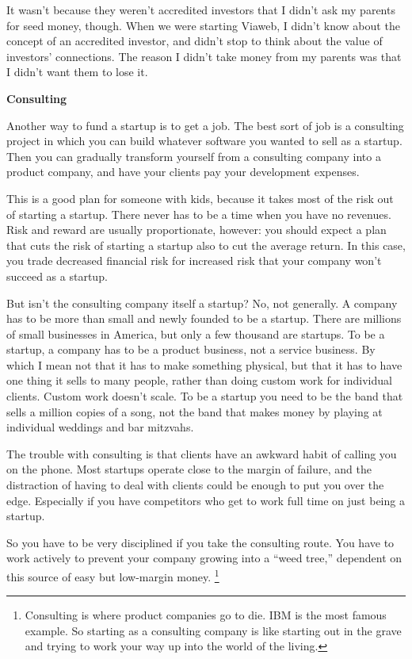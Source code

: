 \documentclass[12pt]{book}
\begin{document}
It wasn't because they weren't accredited investors that I didn't ask my
parents for seed money, though. When we were starting Viaweb, I didn't
know about the concept of an accredited investor, and didn't stop to
think about the value of investors' connections. The reason I didn't
take money from my parents was that I didn't want them to lose it.

\textbf{Consulting}

Another way to fund a startup is to get a job. The best sort of job is a
consulting project in which you can build whatever software you wanted
to sell as a startup. Then you can gradually transform yourself from a
consulting company into a product company, and have your clients pay
your development expenses.

This is a good plan for someone with kids, because it takes most of the
risk out of starting a startup. There never has to be a time when you
have no revenues. Risk and reward are usually proportionate, however:
you should expect a plan that cuts the risk of starting a startup also
to cut the average return. In this case, you trade decreased financial
risk for increased risk that your company won't succeed as a startup.

But isn't the consulting company itself a startup? No, not generally. A
company has to be more than small and newly founded to be a startup.
There are millions of small businesses in America, but only a few
thousand are startups. To be a startup, a company has to be a product
business, not a service business. By which I mean not that it has to
make something physical, but that it has to have one thing it sells to
many people, rather than doing custom work for individual clients.
Custom work doesn't scale. To be a startup you need to be the band that
sells a million copies of a song, not the band that makes money by
playing at individual weddings and bar mitzvahs.

The trouble with consulting is that clients have an awkward habit of
calling you on the phone. Most startups operate close to the margin of
failure, and the distraction of having to deal with clients could be
enough to put you over the edge. Especially if you have competitors who
get to work full time on just being a startup.

So you have to be very disciplined if you take the consulting route. You
have to work actively to prevent your company growing into a ``weed
tree,'' dependent on this source of easy but low-margin money.
\footnote{Consulting is where product companies go to die. IBM is the most
famous example. So starting as a consulting company is like starting out
in the grave and trying to work your way up into the world of the
living.}
\end{document}
